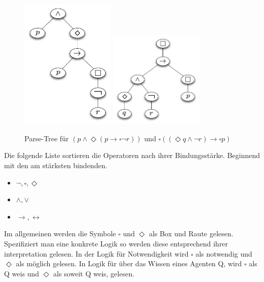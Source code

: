 \begin{figure}
	\begin{center}
  	\includegraphics[width=0.4\textwidth]{./Images/mmFormel01.png}
		\includegraphics[width=0.4\textwidth]{./Images/mmFormel02.png}
  	\caption{Parse-Tree für $(p \wedge \Diamond(p \rightarrow \square \neg r))$ und 
		$\square((\Diamond q \wedge \neg r) \rightarrow \square p )$}
		\label{fig:mmFormel01}
	\end{center}
\end{figure}
%
Die folgende Liste sortieren die Operatoren nach ihrer Bindungsstärke. 
Beginnend mit den am stärksten bindenden.\\
\begin{itemize}
	\item $\neg, \square, \Diamond$
	\item $\wedge, \vee$
	\item $\rightarrow, \leftrightarrow$
\end{itemize}
%
Im allgemeinen werden die Symbole $\square$ und $\Diamond$ als Box und Raute gelesen. 
Spezifiziert man eine konkrete Logik so werden diese entsprechend ihrer interpretation gelesen. In der Logik für Notwendigkeit wird $\square$ als notwendig und $\Diamond$ als möglich gelesen. In Logik für über das Wissen eines Agenten Q, wird $\square$ als Q weis und $\Diamond$ als soweit Q weis, gelesen.


